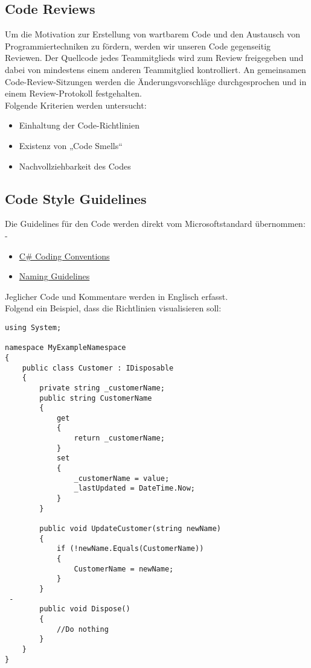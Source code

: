 \subsection{Code Reviews}
Um die Motivation zur Erstellung von wartbarem Code und den Austausch von Programmiertechniken zu fördern, werden wir unseren Code gegenseitig Reviewen. Der Quellcode jedes Teammitglieds wird zum Review freigegeben und dabei von mindestens einem anderen Teammitglied kontrolliert. An gemeinsamen Code-Review-Sitzungen werden die Änderungsvorschläge durchgesprochen und in einem Review-Protokoll festgehalten.
\\Folgende Kriterien werden untersucht:
\\\begin{itemize}
    \item Einhaltung der Code-Richtlinien
    \item Existenz von „Code Smells“
    \item Nachvollziehbarkeit des Codes
\end{itemize}

\newpage
\subsection{Code Style Guidelines}
Die Guidelines für den Code werden direkt vom Microsoftstandard übernommen: 
\\-
\begin{itemize}
	\item \href{http://msdn.microsoft.com/en-us/library/ff926074.aspx}{C\# Coding Conventions}
	\item \href{http://msdn.microsoft.com/en-us/library/xzf533w0(v=vs.71).aspx}{Naming Guidelines}
\end{itemize}
Jeglicher Code und Kommentare werden in Englisch erfasst.
\\Folgend ein Beispiel, dass die Richtlinien visualisieren soll:
\begin{lstlisting}[language=CSharp, caption=Beispiel Code Style Guidelines für C\#, label=lst:helloWorldCSharp, firstnumber=1]
using System;

namespace MyExampleNamespace
{
    public class Customer : IDisposable
    {
        private string _customerName;
        public string CustomerName 
        { 
            get 
            { 
                return _customerName; 
            }
            set
            {
                _customerName = value;
                _lastUpdated = DateTime.Now;
            }
        }

        public void UpdateCustomer(string newName)
        {
            if (!newName.Equals(CustomerName))
            {
                CustomerName = newName;
            }
        }
 -
        public void Dispose()
        {
            //Do nothing
        }
    }
}
\end{lstlisting}
